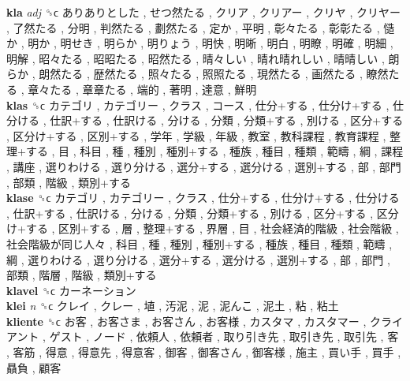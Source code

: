 \textbf{kla} \emph{adj}  ␝ϲ   ありありとした ,  せつ然たる ,  クリア ,  クリアー ,  クリヤ ,  クリヤー ,  了然たる ,  分明 ,  判然たる ,  劃然たる ,  定か ,  平明 ,  彰々たる ,  彰彰たる ,  慥か ,  明か ,  明せき ,  明らか ,  明りょう ,  明快 ,  明晰 ,  明白 ,  明瞭 ,  明確 ,  明細 ,  明解 ,  昭々たる ,  昭昭たる ,  昭然たる ,  晴々しい ,  晴れ晴れしい ,  晴晴しい ,  朗らか ,  朗然たる ,  歴然たる ,  照々たる ,  照照たる ,  現然たる ,  画然たる ,  瞭然たる ,  章々たる ,  章章たる ,  端的 ,  著明 ,  達意 ,  鮮明   \\
\textbf{klas} ␝ϲ   カテゴリ ,  カテゴリー ,  クラス ,  コース ,  仕分+する ,  仕分け+する ,  仕分ける ,  仕訳+する ,  仕訳ける ,  分ける ,  分類 ,  分類+する ,  別ける ,  区分+する ,  区分け+する ,  区別+する ,  学年 ,  学級 ,  年級 ,  教室 ,  教科課程 ,  教育課程 ,  整理+する ,  目 ,  科目 ,  種 ,  種別 ,  種別+する ,  種族 ,  種目 ,  種類 ,  範疇 ,  綱 ,  課程 ,  講座 ,  選りわける ,  選り分ける ,  選分+する ,  選分ける ,  選別+する ,  部 ,  部門 ,  部類 ,  階級 ,  類別+する   \\
\textbf{klase} ␝ϲ   カテゴリ ,  カテゴリー ,  クラス ,  仕分+する ,  仕分け+する ,  仕分ける ,  仕訳+する ,  仕訳ける ,  分ける ,  分類 ,  分類+する ,  別ける ,  区分+する ,  区分け+する ,  区別+する ,  層 ,  整理+する ,  界層 ,  目 ,  社会経済的階級 ,  社会階級 ,  社会階級が同じ人々 ,  科目 ,  種 ,  種別 ,  種別+する ,  種族 ,  種目 ,  種類 ,  範疇 ,  綱 ,  選りわける ,  選り分ける ,  選分+する ,  選分ける ,  選別+する ,  部 ,  部門 ,  部類 ,  階層 ,  階級 ,  類別+する   \\
\textbf{klavel} ␝ϲ   カーネーション   \\
\textbf{klei} \emph{n}  ␝ϲ   クレイ ,  クレー ,  埴 ,  汚泥 ,  泥 ,  泥んこ ,  泥土 ,  粘 ,  粘土   \\
\textbf{kliente} ␝ϲ   お客 ,  お客さま ,  お客さん ,  お客様 ,  カスタマ ,  カスタマー ,  クライアント ,  ゲスト ,  ノード ,  依頼人 ,  依頼者 ,  取り引き先 ,  取引き先 ,  取引先 ,  客 ,  客筋 ,  得意 ,  得意先 ,  得意客 ,  御客 ,  御客さん ,  御客様 ,  施主 ,  買い手 ,  買手 ,  贔負 ,  顧客   \\
